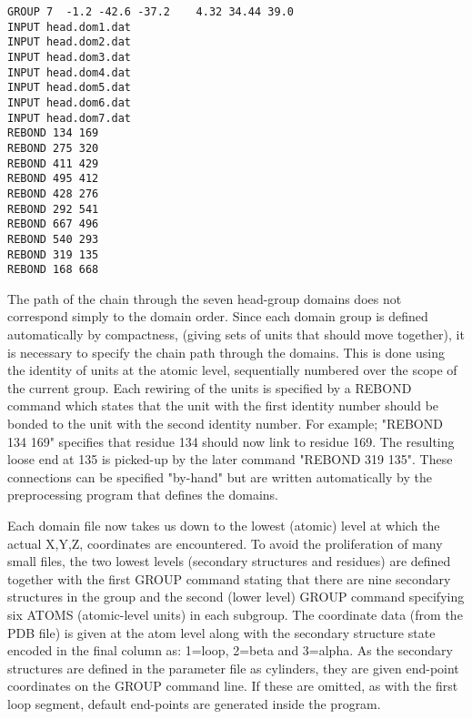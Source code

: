\begin{singlespace}
\begin{verbatim}
GROUP 7  -1.2 -42.6 -37.2    4.32 34.44 39.0
INPUT head.dom1.dat
INPUT head.dom2.dat
INPUT head.dom3.dat
INPUT head.dom4.dat
INPUT head.dom5.dat
INPUT head.dom6.dat
INPUT head.dom7.dat
REBOND 134 169
REBOND 275 320
REBOND 411 429
REBOND 495 412
REBOND 428 276
REBOND 292 541
REBOND 667 496
REBOND 540 293
REBOND 319 135
REBOND 168 668
\end{verbatim}
\end{singlespace}

The path of the chain through the seven head-group domains does not correspond simply
to the domain order.  Since each domain group is defined automatically by compactness,
(giving sets of units that should move together), it is necessary to specify the 
chain path through the domains.  This is done using the identity of units
at the atomic level, sequentially numbered over the scope of the current group. 
Each rewiring of the units is specified by a REBOND command which states that the
unit with the first identity number should be bonded to the unit with the second 
identity number.  For example; "REBOND 134 169" specifies that residue 134 should
now link to residue 169.  The resulting loose end at 135 is picked-up by the later
command "REBOND 319 135".   These connections can be specified "by-hand" but are
written automatically by the preprocessing program that defines the domains.

Each domain file now takes us down to the lowest (atomic) level at which the actual
X,Y,Z, coordinates are encountered.   To avoid the proliferation of many small files,
the two lowest levels (secondary structures and residues) are defined together with
the first GROUP command stating that there are nine secondary structures in the 
group and the second (lower level) GROUP command specifying six ATOMS (atomic-level
units) in each subgroup.   The coordinate data (from the PDB file) is given at the
atom level along with the secondary structure state encoded in the final column as:
1=loop, 2=beta and 3=alpha.   As the secondary structures are defined in the
parameter file as cylinders, they are given end-point coordinates on the GROUP
command line.  If these are omitted, as with the first loop segment, default 
end-points are generated inside the program.

